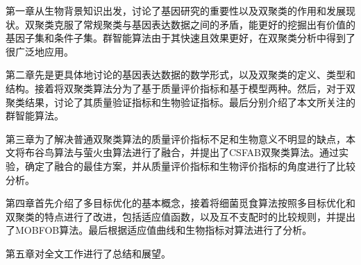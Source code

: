     第一章从生物背景知识出发，讨论了基因研究的重要性以及双聚类的作用和发展现状。双聚类克服了常规聚类与基因表达数据之间的矛盾，能更好的挖掘出有价值的基因子集和条件子集。群智能算法由于其快速且效果更好，在双聚类分析中得到了很广泛地应用。

    第二章先是更具体地讨论的基因表达数据的数学形式，以及双聚类的定义、类型和结构。接着将双聚类算法分为了基于质量评价指标和基于模型两种。然后，对于双聚类结果，讨论了其质量验证指标和生物验证指标。最后分别介绍了本文所关注的群智能算法。

    第三章为了解决普通双聚类算法的质量评价指标不足和生物意义不明显的缺点，本文将布谷鸟算法与萤火虫算法进行了融合，并提出了CSFAB双聚类算法。通过实验，确定了融合的最佳方案，并从质量评价指标和生物评价指标的角度进行了比较分析。

    第四章首先介绍了多目标优化的基本概念，接着将细菌觅食算法按照多目标优化和双聚类的特点进行了改进，包括适应值函数，以及互不支配时的比较规则，并提出了MOBFOB算法。最后根据适应值曲线和生物指标对算法进行了分析。
    
    第五章对全文工作进行了总结和展望。
